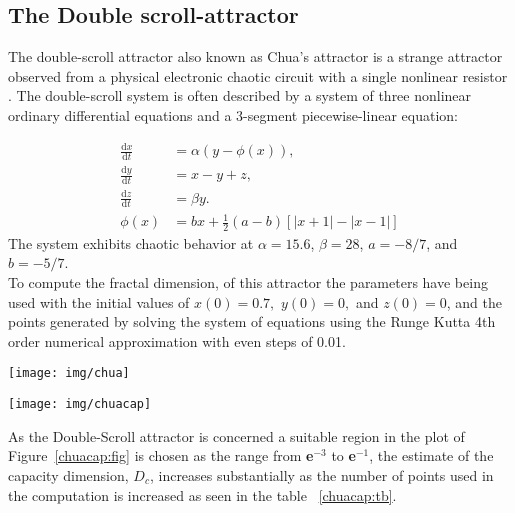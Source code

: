 \subsection{The Double scroll-attractor}
The double-scroll attractor also known as Chua's attractor is a strange attractor observed from a physical electronic chaotic circuit with a single nonlinear resistor . The double-scroll system is often described by a system of three nonlinear ordinary differential equations and a 3-segment piecewise-linear equation:

\begin{subequations}
\begin{align}
\frac{\mathrm{d}x}{\mathrm{d}t} &= \alpha(y- \phi(x)),  \\
\frac{\mathrm{d}y}{\mathrm{d}t} &= x - y + z, \\
\frac{\mathrm{d}z}{\mathrm{d}t} &= \beta y.\\
\phi(x) &= bx + \frac{1}{2}(a - b)\left[|x + 1| - |x - 1|\right]
\end{align}
\end{subequations}
The system exhibits chaotic behavior at $ \alpha = 15.6$, $\beta = 28$, $a = -8/7$, and $b = -5/7$.\\
To compute the fractal dimension, of this attractor the parameters have being used with the initial values of $x(0) = 0.7,$ $y(0) = 0,$ and $z(0)=0$, and the points generated by solving the system of equations using the Runge Kutta 4th order numerical approximation with even steps of 0.01.
	\begin{center}
	\texttt{[image: img/chua]}
	\label{Chuaatt:fig}
	\end{center}
	\vspace{10pt}

\vspace{70pt}



	\begin{center}
	\texttt{[image: img/chuacap]}
	\label{chuacap:fig}
	\end{center}
As the Double-Scroll attractor is concerned a suitable region in the plot of Figure~\ref{chuacap:fig} is chosen as the range from \textbf{e$^{-3}$} to \textbf{e$^{-1}$}, the estimate of the capacity dimension, $D_{c}$, increases substantially as the number of points used in the computation is increased as seen in the table ~\ref{chuacap:tb}.

